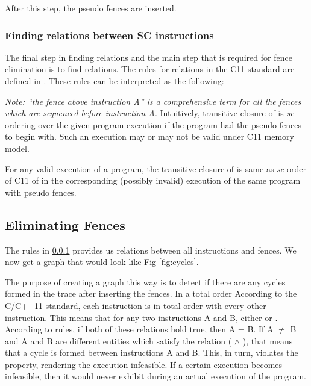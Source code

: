 \par
After this step, the pseudo fences are inserted.

\subsubsection{Finding \setTO relations between SC instructions}\label{to_rel}
The final step in finding relations and the main step that is required for 
fence elimination is to find \setTO relations. The rules for \setTO relations 
in the C11 standard are defined in \cite{C11}. These rules can be interpreted 
as the following:

\textit{Note: ``the fence above instruction A'' is a comprehensive term for all 
	the fences which are sequenced-before instruction A.}
Intuitively, transitive closure of \setTO is \emph{sc} ordering over the 
given program execution if the program had the pseudo fences to begin with.
Such an execution may or may not be valid under C11 memory model.

\begin{theorem}
	For any valid execution of a program, the transitive closure of \setTO 
	is same as \emph{sc} order of C11 of in the corresponding (possibly 
	invalid) execution of the same program with pseudo fences.
\end{theorem}

\subsection{Eliminating Fences}
The rules in \textsection\ref{to_rel} provides us \setTO relations between all 
instructions and fences. We now get a graph that would look 
like Fig \ref{fig:cycles}. 


\par
The purpose of creating a graph this way is to detect if there are any cycles 
formed in the trace after inserting the fences. 
In a total order 
According to the C/C++11 standard, each \mosc instruction is in total order 
with every other \mosc instruction. This means that for any two \mosc 
instructions A and B, either  or . According to 
\setTO rules, if both of these relations hold true, then A = B. 
If A $\neq$ B and A and B are different entities which satisfy the 
relation ( $\land$ ), that means that a cycle is 
formed between instructions A and B. This, in turn, violates the \setTO 
property, rendering the execution infeasible. If a certain execution 
becomes infeasible, then it would never exhibit during an actual execution 
of the program.

